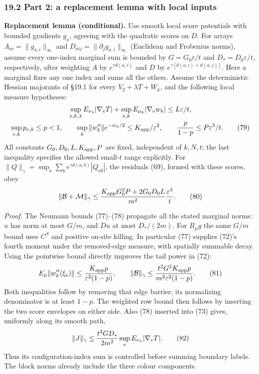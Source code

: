 \documentclass[11pt,a4paper]{article}
\begin{document}
\hypertarget{part-2-a-replacement-lemma-with-local-inputs}{%
\subsubsection{19.2 Part 2: a replacement lemma with local
inputs}\label{part-2-a-replacement-lemma-with-local-inputs}}

\textbf{Replacement lemma (conditional).} Use smooth local score
potentials with bounded gradients \(g_a\), agreeing with the quadratic
scores on \(D\). For arrays \(A_{ai}=\|g_{a,i}\|_\infty\) and
\(D_{aij}=\|\partial_jg_{a,i}\|_\infty\) (Euclidean and Frobenius
norms), assume every one-index marginal sum is bounded by
\(G=G_0\varepsilon/t\) and \(D_*=D_0\varepsilon/t\), respectively, after
weighting \(A\) by \(e^{\gamma d(a,i)}\) and \(D\) by
\(e^{\gamma[d(a,i)+d(a,j)]}\). Here a marginal fixes any one index and
sums all the others. Assume the deterministic Hessian majorants of §19.1
for every \(V_2+\lambda T+W_k\), and the following local measure
hypotheses: \[\begin{gathered}
\sup_{e,k,\lambda}E_{\nu_\lambda}|\nabla_eT|
 +\sup_{e,k}E_{\mu_k}|\nabla_ew_k|\le L\varepsilon/t,\\
\sup_{e,k}p_{e,k}\le p<1,\qquad
\sup_k\|w_k''\|e^{-w_k/2}\le K_{\rm app}/\varepsilon^2,
\qquad {p\over1-p}\le P\varepsilon^3/t.\tag{79}
\end{gathered}\] All constants \(G_0,D_0,L,K_{\rm app},P\) are fixed,
independent of \(k,N,t\); the last inequality specifies the allowed
small-\(t\) range explicitly. For
\(\|Q\|_\gamma=\sup_a\sum_b e^{\gamma d(a,b)}|Q_{ab}|\), the residuals
(69), formed with these scores, obey \[\|\mathcal B+\mathcal M\|_\gamma
\le {K_{\rm app}G_0^2P+2G_0D_0L\over m^2}
 {\varepsilon^3\over t}.\tag{80}\]

\emph{Proof.} The Neumann bounds (77)--(78) propagate all the stated
marginal norms: \(u\) has norm at most \(G/m\), and \(Du\) at most
\(D_* /(2m)\). For \(R_\mu g\) the same \(G/m\) bound uses \(C^S\) and
positive on-site killing. In particular (77) supplies (72)'s fourth
moment under the removed-edge measure, with spatially summable decay.
Using the pointwise bound directly improves the tail power in (72):
\[E_\mu\|w_k''(\xi_e)\|
 \le {K_{\rm app}p\over\varepsilon^2(1-p)},\qquad
\|\mathcal B\|_\gamma
 \le {t^2G^2K_{\rm app}p\over m^2\varepsilon^2(1-p)}.\tag{81}\] Both
inequalities follow by removing that edge barrier; its normalizing
denominator is at least \(1-p\). The weighted row bound then follows by
inserting the two score envelopes on either side. Also (78) inserted
into (73) gives, uniformly along its smooth path,
\[\|J\|_\gamma\le {t^2GD_*\over2m^2}
 \sup_eE_{\nu_\lambda}|\nabla_eT|.\tag{82}\] Thus its
configuration-index sum is controlled before summing boundary labels.
The block norms already include the three colour components.
\end{document}
